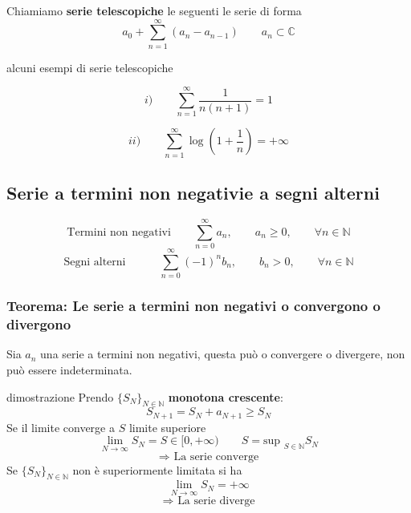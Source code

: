 \documentclass[x11names]{article}
\begin{document}
	\noindent
	Chiamiamo \textbf{serie telescopiche} le seguenti le serie di forma
	\[ 
	a_{0} + \sum_{n=1}^{\infty} (a_{n} - a_{n-1}) \qquad a_{n} \subset \mathbb{C}
	\]
	\begin{es}{alcuni esempi di serie telescopiche}
		\begin{minipage}{0.5\textwidth}
			\[ 
			i) \qquad \sum_{n=1}^{\infty} \frac{1}{n(n+1)} = 1
			\]
		\end{minipage}
		\begin{minipage}{0.5\textwidth}
			\[ 
			ii) \qquad \sum_{n=1}^{\infty} \log\left(1 + \frac{1}{n}\right) = +\infty
			\]
		\end{minipage}
	\end{es}	
	
	\subsection{Serie a termini non negativie a segni alterni}
	
	\[ 
	\text{Termini non negativi} \qquad \sum_{n=0}^{\infty} a_{n}, \qquad a_{n} \geq 0, \qquad \forall n \in \mathbb{N}
	\]
	\[ 
	\text{Segni alterni} \quad \qquad \sum_{n=0}^{\infty} (-1)^nb_{n}, \qquad b_{n} > 0, \qquad \forall n \in \mathbb{N}
	\]
	\begin{center}
		\colorbox{myred}{\begin{minipage}{5.75in}
				\begin{redes}{}
					\subsubsection{Teorema: Le serie a termini non negativi o convergono o divergono}
					Sia \(a_{n}\) una serie a termini non negativi, questa può o convergere o divergere, non può essere indeterminata.
				\end{redes}
		\end{minipage}}        
	\end{center}
	\begin{es}{dimostrazione}
		Prendo \(\{S_{N}\}_{N\in\mathbb{N}}\) \textbf{monotona crescente}:
		\[ 
		S_{N+1} = S_{N} + a_{N+1} \geq S_{N}
		\]
		Se il limite converge a \(S\) limite superiore 
		\[ 
		\lim_{N\to\infty} S_{N} = S \in [0,+\infty)  \qquad S = \text{sup }_{S\in\mathbb{N}} S_{N}
		\]
		\[ 
		\Longrightarrow \text{ La serie converge}
		\]
		Se \(\{S_{N}\}_{N\in\mathbb{N}}\) non è superiormente limitata si ha 
		\[ 
		\lim_{N\to\infty} S_{N} = +\infty
		\]
		\[ 
		\Longrightarrow \text{ La serie diverge}
		\]

	\end{es}
	
\end{document}

